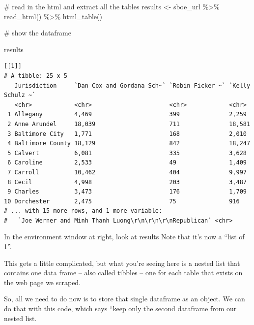 \documentclass[
  letterpaper,
  DIV=11,
  numbers=noendperiod]{scrreprt}
\newenvironment{Shaded}{\begin{snugshade}}{\end{snugshade}}
\newcommand{\CommentTok}[1]{\textcolor[rgb]{0.37,0.37,0.37}{#1}}
\newcommand{\FunctionTok}[1]{\textcolor[rgb]{0.28,0.35,0.67}{#1}}
\newcommand{\NormalTok}[1]{\textcolor[rgb]{0.00,0.23,0.31}{#1}}
\newcommand{\OtherTok}[1]{\textcolor[rgb]{0.00,0.23,0.31}{#1}}
\newcommand{\SpecialCharTok}[1]{\textcolor[rgb]{0.37,0.37,0.37}{#1}}
\begin{document}
\begin{Shaded}
\begin{Highlighting}[]
\CommentTok{\# read in the html and extract all the tables}
\NormalTok{results }\OtherTok{\textless{}{-}}\NormalTok{ sboe\_url }\SpecialCharTok{\%\textgreater{}\%}
  \FunctionTok{read\_html}\NormalTok{() }\SpecialCharTok{\%\textgreater{}\%}
  \FunctionTok{html\_table}\NormalTok{()}

\CommentTok{\# show the dataframe}

\NormalTok{results}
\end{Highlighting}
\end{Shaded}

\begin{verbatim}
[[1]]
# A tibble: 25 x 5
   Jurisdiction     `Dan Cox and Gordana Sch~` `Robin Ficker ~` `Kelly Schulz ~`
   <chr>            <chr>                      <chr>            <chr>           
 1 Allegany         4,469                      399              2,259           
 2 Anne Arundel     18,039                     711              18,581          
 3 Baltimore City   1,771                      168              2,010           
 4 Baltimore County 18,129                     842              18,247          
 5 Calvert          6,081                      335              3,628           
 6 Caroline         2,533                      49               1,409           
 7 Carroll          10,462                     404              9,997           
 8 Cecil            4,998                      203              3,487           
 9 Charles          3,473                      176              1,709           
10 Dorchester       2,475                      75               916             
# ... with 15 more rows, and 1 more variable:
#   `Joe Werner and Minh Thanh Luong\r\n\r\n\r\nRepublican` <chr>
\end{verbatim}

In the environment window at right, look at results Note that it's now a
``list of 1''.

This gets a little complicated, but what you're seeing here is a nested
list that contains one data frame -- also called tibbles -- one for each
table that exists on the web page we scraped.

So, all we need to do now is to store that single dataframe as an
object. We can do that with this code, which says ``keep only the second
dataframe from our nested list.
\end{document}
